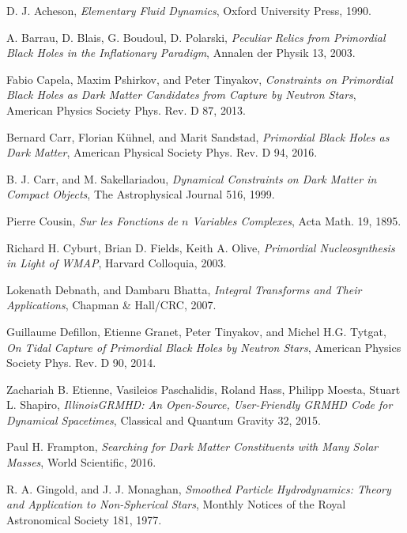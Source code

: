 \documentclass{jthesis}
\begin{document}
\begin{thebibliography}{99}

D. J. Acheson, \emph{Elementary Fluid Dynamics}, Oxford University Press, 1990.

A. Barrau, D. Blais, G. Boudoul, D. Polarski, \emph{Peculiar Relics from Primordial Black Holes in the Inflationary Paradigm}, Annalen der Physik 13, 2003.

Fabio Capela, Maxim Pshirkov, and Peter Tinyakov, \emph{Constraints on Primordial Black Holes as Dark Matter Candidates from Capture by Neutron Stars}, American Physics Society Phys. Rev. D 87, 2013.

Bernard Carr, Florian K{\"u}hnel, and Marit Sandstad, \emph{Primordial Black Holes as Dark Matter}, American Physical Society Phys. Rev. D 94, 2016.

B. J. Carr, and M. Sakellariadou, \emph{Dynamical Constraints on Dark Matter in Compact Objects}, The Astrophysical Journal 516, 1999.

Pierre Cousin, \emph{Sur les Fonctions de $n$ Variables Complexes}, Acta Math. 19, 1895.

Richard H. Cyburt, Brian D. Fields, Keith A. Olive, \emph{Primordial Nucleosynthesis in Light of WMAP}, Harvard Colloquia, 2003.

Lokenath Debnath, and Dambaru Bhatta, \emph{Integral Transforms and Their Applications}, Chapman \& Hall/CRC, 2007.

Guillaume Defillon, Etienne Granet, Peter Tinyakov, and Michel H.G. Tytgat, \emph{On Tidal Capture of Primordial Black Holes by Neutron Stars}, American Physics Society Phys. Rev. D 90, 2014.

Zachariah B. Etienne, Vasileios Paschalidis, Roland Hass, Philipp Moesta, Stuart L. Shapiro, \emph{IllinoisGRMHD: An Open-Source, User-Friendly GRMHD Code for Dynamical Spacetimes}, Classical and Quantum Gravity 32, 2015.

Paul H. Frampton, \emph{Searching for Dark Matter Constituents with Many Solar Masses}, World Scientific, 2016.

R. A. Gingold, and J. J. Monaghan, \emph{Smoothed Particle Hydrodynamics: Theory and Application to Non-Spherical Stars}, Monthly Notices of the Royal Astronomical Society 181, 1977.


\end{thebibliography}
\end{document}
